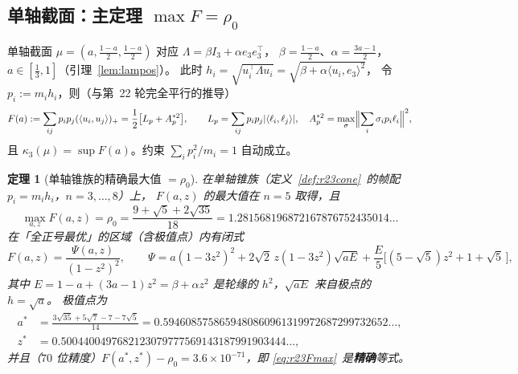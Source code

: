 \documentclass[UTF8,11pt]{ctexart}
\newtheorem{theorem}{定理}[section]
\theoremstyle{definition}
\newcommand{\Lam}{\Lambda}
\begin{document}
\subsection{单轴截面：主定理 $\max F=\rho_0$}\label{sec:r23:uni}

单轴截面 $\mu=(a,\frac{1-a}2,\frac{1-a}2)$ 对应 $\Lam=\beta I_3+\alpha e_3e_3^\top$，
$\beta=\frac{1-a}2$、$\alpha=\frac{3a-1}2$，$a\in[\frac13,1]$（引理~\ref{lem:lampos}）。
此时 $h_i=\sqrt{u_i^\top\Lam u_i}=\sqrt{\beta+\alpha\langle u_i,e_3\rangle^2}$，
令 $p_i:=m_ih_i$，则（与第~22 轮完全平行的推导）
\begin{equation}\label{eq:r23F}
F(a):=\sum_{ij}p_ip_j(\langle u_i,u_j\rangle)_+=\frac12\bigl[L_p+A_p^{*2}\bigr],
\qquad L_p=\sum_{ij}p_ip_j|\langle\ell_i,\ell_j\rangle|,\quad
A_p^{*2}=\max_\sigma\Bigl\|\sum_i\sigma_ip_i\ell_i\Bigr\|^2,
\end{equation}
且 $\kappa_3(\mu)=\sup F(a)$。约束 $\sum_ip_i^2/m_i=1$ 自动成立。

\begin{theorem}[单轴锥族的精确最大值 $=\rho_0$]\label{thm:r23uni}
在单轴锥族（定义~\ref{def:r23cone}~的帧配 $p_i=m_ih_i$，$n=3,\dots,8$）上，
$F(a,z)$ 的最大值在 $n=5$ 取得，且
\begin{equation}\label{eq:r23Fmax}
\max_{a,z}F(a,z)=\rho_0=\frac{9+\sqrt5+2\sqrt{35}}{18}=1.281568196872167876752435014\ldots
\end{equation}
在「全正号最优」的区域（含极值点）内有闭式
\begin{equation}\label{eq:r23Fclosed}
F(a,z)=\frac{\Psi(a,z)}{(1-z^2)^2},\qquad
\Psi=a(1-3z^2)^2+2\sqrt2\,z(1-3z^2)\sqrt{aE}+\frac E5\bigl[(5-\sqrt5)z^2+1+\sqrt5\,\bigr],
\end{equation}
其中 $E=1-a+(3a-1)z^2=\beta+\alpha z^2$ 是轮缘的 $h^2$，$\sqrt{aE}$ 来自极点的 $h=\sqrt a$。
极值点为
\begin{align}
a^*&=\frac{3\sqrt{35}+5\sqrt7-7-7\sqrt5}{14}=0.5946085758659480860961319972687299732652\ldots,\label{eq:r23astar}\\
z^*&=0.5004400497682123079777569143187991903444\ldots,\label{eq:r23zstar2}
\end{align}
并且（$70$ 位精度）$F(a^*,z^*)-\rho_0=3.6\times10^{-71}$，即 \eqref{eq:r23Fmax}~是\textbf{精确}等式。
\end{theorem}
\end{document}
